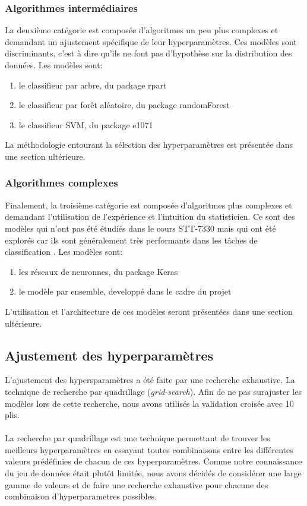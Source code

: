 \subsubsection{Algorithmes intermédiaires}
La deuxième catégorie est composée d'algoritmes un peu plus complexes et demandant un ajustement spécifique de leur hyperparamètres. Ces modèles sont discriminants, c'est à dire qu'ils ne font pas d'hypothèse sur la distribution des données. Les modèles sont:

\begin{enumerate}
  \item le classifieur par arbre, du package rpart \cite{packagerpart}
  \item le classifieur par forêt aléatoire, du package randomForest \cite{packagerandomForest}
  \item le classifieur SVM, du package e1071 \cite{packagee1071}
\end{enumerate}

La méthodologie entourant la sélection des hyperparamètres est présentée dans une section ultérieure.

\subsubsection{Algorithmes complexes}
Finalement, la troisième catégorie est composée d'algoritmes plus complexes et demandant l'utilisation de l'expérience et l'intuition du statisticien. Ce sont des modèles qui n'ont pas été étudiés dans le cours STT-7330 mais qui ont été explorés car ils sont généralement très performants dans les tâches de classification . Les modèles sont:

\begin{enumerate}
  \item les réseaux de neuronnes, du package Keras \cite{packagekeras}
  \item le modèle par ensemble, developpé dans le cadre du projet
\end{enumerate}

L'utilisation et l'architecture de ces modèles seront présentées dans une section ultérieure.

\subsection{Ajustement des hyperparamètres}
L'ajustement des hypersparamètres a été faite par une recherche exhaustive. La technique de recherche par quadrillage (\textit{grid-search}). Afin de ne pas surajuster les modèles lors de cette recherche, nous avons utilisés la validation croisée avec 10 plis.\\ \\ 
La recherche par quadrillage est une technique permettant de trouver les meilleurs hyperparamètres en essayant toutes combinaisons entre les différentes valeurs prédéfinies de chacun de ces hyperparamètres. Comme notre connaissance du jeu de données était plutôt limitée, nous avons décidés de considérer une large gamme de valeurs et de faire une recherche exhaustive pour chacune des combinaison d'hyperparametres possibles.

